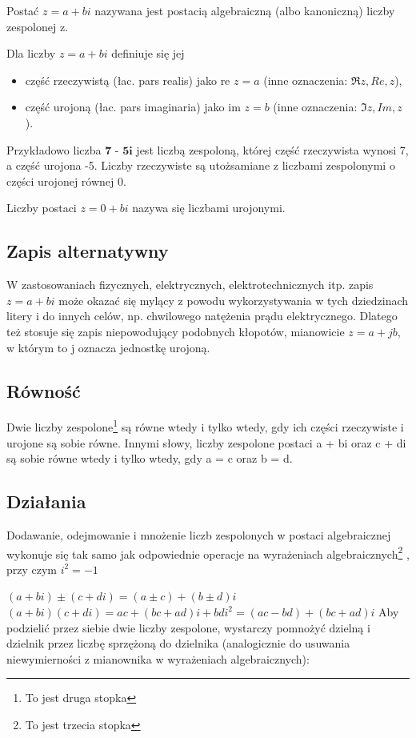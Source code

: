 \documentclass[a4paper,11pt]{article}
\begin{document}
Postać $z=a+bi$ nazywana jest postacią algebraiczną (albo kanoniczną) liczby zespolonej z.

Dla liczby $z=a+bi$ definiuje się jej
\begin{itemize}
\item część rzeczywistą (łac. pars realis) jako re $z = a$ (inne oznaczenia: $\Re z, Re, z$),
\item część urojoną (łac. pars imaginaria) jako im $z = b$ (inne oznaczenia: $\Im z, Im, z$).
\end{itemize}
Przykładowo liczba $\textbf{7 - 5i}$ jest liczbą zespoloną, której część rzeczywista wynosi 7, a część urojona -5. Liczby rzeczywiste są utożsamiane z liczbami zespolonymi o części urojonej równej 0.

Liczby postaci $z = 0 + bi$ nazywa się liczbami urojonymi.
\subsection{Zapis alternatywny}
W zastosowaniach fizycznych, elektrycznych, elektrotechnicznych itp. zapis $z = a + bi$ może okazać się mylący z powodu wykorzystywania w tych dziedzinach litery \textrm{\Large{i}} do innych celów, np. chwilowego natężenia prądu elektrycznego. Dlatego też stosuje się zapis niepowodujący podobnych kłopotów, mianowicie $z = a + jb$, w którym to j oznacza jednostkę urojoną.
\subsection{Równość}
Dwie liczby zespolone\footnote{To jest druga stopka}
 są równe wtedy i tylko wtedy, gdy ich części rzeczywiste i urojone są sobie równe. Innymi słowy, liczby zespolone postaci a + bi oraz c + di są sobie równe wtedy i tylko wtedy, gdy a = c oraz b = d.

\newpage
\subsection{Działania}
Dodawanie, odejmowanie i mnożenie liczb zespolonych w postaci algebraicznej wykonuje się tak samo jak odpowiednie operacje na wyrażeniach algebraicznych\footnote{To jest trzecia stopka}
, przy czym $i^2 = -1$

$(a + bi) \pm (c + di) = (a \pm c) + (b \pm d)i$
\newline
$(a + bi)(c + di) = ac + (bc + ad)i + bdi^2 = (ac - bd) + (bc + ad)i$
Aby podzielić przez siebie dwie liczby zespolone, wystarczy pomnożyć dzielną i dzielnik przez liczbę sprzężoną do dzielnika (analogicznie do usuwania niewymierności z mianownika w wyrażeniach algebraicznych):
\end{document}
